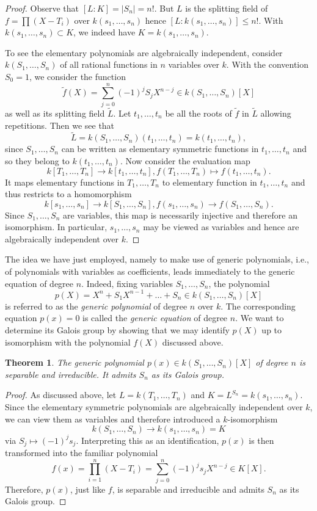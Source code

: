 \documentclass[12pt]{report}
\newtheorem{theorem}{Theorem}[section]
\theoremstyle{definition}
\begin{document}
\begin{proof}
	Observe that $[L:K]=|S_n|=n!$. But $L$ is the splitting field of $f=\prod(X-T_i)$ over $k(s_1,\dots,s_n)$ hence $[L:k(s_1,\dots,s_n)]\leq n!$. With $k(s_1,\dots,s_n)\subset K$, we indeed have $K=k(s_1,\dots,s_n)$. 

	To see the elementary polynomials are algebraically independent, consider $k(S_1,\dots,S_n)$ of all rational functions in $n$ variables over $k$. With the convention $S_0=1$, we consider the function $$\tilde{f}(X)=\sum_{j=0}^n(-1)^jS_j X^{n-j}\in k(S_1,\dots,S_n)[X]$$ as well as its splitting field $\tilde{L}$. Let $t_1,\dots,t_n$ be all the roots of $\tilde{f}$ in $\tilde{L}$ allowing repetitions. Then we see that $$\tilde{L}=k(S_1,\dots,S_n)(t_1,\dots,t_n)=k(t_1,\dots,t_n),$$ since $S_1,\dots,S_n$ can be written as elementary symmetric functions in $t_1,\dots,t_n$ and so they belong to $k(t_1,\dots,t_n)$. Now consider the evaluation map 
	\[k[T_1,\dots,T_n]\to k[t_1,\dots,t_n], f(T_1,\dots,T_n)\mapsto f(t_1,\dots,t_n).\] It maps elementary functions in $T_1,\dots,T_n$ to elementary function in $t_1,\dots,t_n$ and thus restricts to a homomorphism $$k[s_1,\dots,s_n]\to k[S_1,\dots,S_n], f(s_1,\dots,s_n)\to f(S_1,\dots,S_n).$$ Since $S_1,\dots,S_n$ are variables, this map is necessarily injective and therefore an isomorphism. In particular, $s_1,\dots,s_n$ may be viewed as variables and hence are algebraically independent over $k$. 
\end{proof}

The idea we have just employed, namely to make use of generic polynomials, i.e., of polynomials with variables as coefficients, leads immediately to the generic equation of degree $n$. Indeed, fixing variables $S_1, \dots, S_n$, the polynomial 
$$p(X) = X^n + S_1X^{n-1} + \dots + S_n \in k(S_1,\dots, S_n)[X]$$
is referred to as the \emph{generic polynomial} of degree $n$ over $k$. The corresponding equation $p(x) = 0$ is called the \emph{generic equation} of degree $n$. We want to determine its Galois group by showing that we may identify $p(X)$ up to isomorphism with the polynomial $f(X)$ discussed above.


\begin{theorem}
	The generic polynomial $p(x)\in k(S_1,\dots,S_n)[X]$ of degree $n$ is separable and irreducible. It admits $S_n$ as its Galois group.
\end{theorem}

\begin{proof}
	As discussed above, let $L=k(T_1,\dots,T_n)$ and $K=L^{S_n}=k(s_1,\dots,s_n)$. Since the elementary symmetric polynomials are algebraically independent over $k$, we can view them as variables and therefore introduced a $k$-isomorphism
	$$k(S_1,\dots,S_n)\to k(s_1,\dots,s_n)=K$$ via $S_j\mapsto (-1)^js_j$. Interpreting this as an identification, $p(x)$ is then transformed into the familiar polynomial $$f(x)=\prod_{i=1}^n(X-T_i)=\sum_{j=0}^n(-1)^js_jX^{n-j}\in K[X].$$
	Therefore, $p(x)$, just like $f$, is separable and irreducible and admits $S_n$ as its Galois group.
\end{proof}
\end{document}
